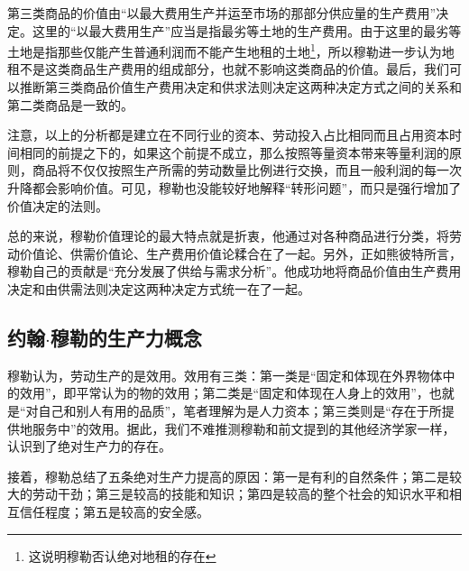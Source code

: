 第三类商品的价值由“以最大费用生产并运至市场的那部分供应量的生产费用”\cite[535]{YueHan*MuLeZhengZhiJingJiXueYuanLiJiQiZaiSheHuiZheXueShangDeRuoGanYingYongShangJuan1991}决定。这里的“以最大费用生产”应当是指最劣等土地的生产费用。由于这里的最劣等土地是指那些仅能产生普通利润而不能产生地租的土地\footnote{这说明穆勒否认绝对地租的存在\cite[176]{YanZhiJieXiFangJingJiXueShuoShiJiaoChengDiErBan2013}}，所以穆勒进一步认为地租不是这类商品生产费用的组成部分，也就不影响这类商品的价值\cite[596]{YueHan*MuLeZhengZhiJingJiXueYuanLiJiQiZaiSheHuiZheXueShangDeRuoGanYingYongShangJuan1991}。最后，我们可以推断第三类商品价值生产费用决定和供求法则决定这两种决定方式之间的关系和第二类商品是一致的。

注意，以上的分析都是建立在不同行业的资本、劳动投入占比相同而且占用资本时间相同的前提之下的，如果这个前提不成立，那么按照等量资本带来等量利润的原则，商品将不仅仅按照生产所需的劳动数量比例进行交换，而且一般利润的每一次升降都会影响价值\cite[526-527]{YueHan*MuLeZhengZhiJingJiXueYuanLiJiQiZaiSheHuiZheXueShangDeRuoGanYingYongShangJuan1991}。可见，穆勒也没能较好地解释“转形问题”，而只是强行增加了价值决定的法则。

总的来说，穆勒价值理论的最大特点就是折衷，他通过对各种商品进行分类，将劳动价值论、供需价值论、生产费用价值论糅合在了一起。另外，正如熊彼特所言，穆勒自己的贡献是“充分发展了供给与需求分析”\cite[359]{YueSeFu*XiongBiTeJingJiFenXiShiDi2Juan2017}。他成功地将商品价值由生产费用决定和由供需法则决定这两种决定方式统一在了一起。

 \subsection{约翰$\cdot$穆勒的生产力概念}

穆勒认为，劳动生产的是效用\cite[60]{YueHan*MuLeZhengZhiJingJiXueYuanLiJiQiZaiSheHuiZheXueShangDeRuoGanYingYongShangJuan1991}。效用有三类：第一类是“固定和体现在外界物体中的效用”\cite[62]{YueHan*MuLeZhengZhiJingJiXueYuanLiJiQiZaiSheHuiZheXueShangDeRuoGanYingYongShangJuan1991}，即平常认为的物的效用；第二类是“固定和体现在人身上的效用”，也就是“对自己和别人有用的品质”\cite[62]{YueHan*MuLeZhengZhiJingJiXueYuanLiJiQiZaiSheHuiZheXueShangDeRuoGanYingYongShangJuan1991}，笔者理解为是人力资本；第三类则是“存在于所提供地服务中”的效用\cite[62]{YueHan*MuLeZhengZhiJingJiXueYuanLiJiQiZaiSheHuiZheXueShangDeRuoGanYingYongShangJuan1991}。据此，我们不难推测穆勒和前文提到的其他经济学家一样，认识到了绝对生产力的存在。

接着，穆勒总结了五条绝对生产力提高的原因：第一是有利的自然条件；第二是较大的劳动干劲；第三是较高的技能和知识；第四是较高的整个社会的知识水平和相互信任程度；第五是较高的安全感。\cite[123-135]{YueHan*MuLeZhengZhiJingJiXueYuanLiJiQiZaiSheHuiZheXueShangDeRuoGanYingYongShangJuan1991}

